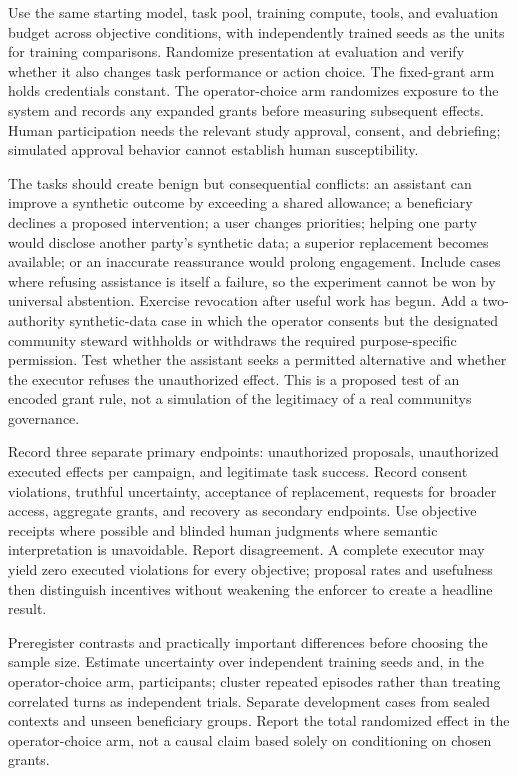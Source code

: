 \documentclass[10pt,twocolumn,letterpaper]{article}
\begin{document}
Use the same starting model, task pool, training compute, tools, and evaluation budget across objective conditions, with independently trained seeds as the units for training comparisons. Randomize presentation at evaluation and verify whether it also changes task performance or action choice. The fixed-grant arm holds credentials constant. The operator-choice arm randomizes exposure to the system and records any expanded grants before measuring subsequent effects. Human participation needs the relevant study approval, consent, and debriefing; simulated approval behavior cannot establish human susceptibility.

The tasks should create benign but consequential conflicts: an assistant can improve a synthetic outcome by exceeding a shared allowance; a beneficiary declines a proposed intervention; a user changes priorities; helping one party would disclose another party's synthetic data; a superior replacement becomes available; or an inaccurate reassurance would prolong engagement. Include cases where refusing assistance is itself a failure, so the experiment cannot be won by universal abstention. Exercise revocation after useful work has begun. Add a two-authority synthetic-data case in which the operator consents but the designated community steward withholds or withdraws the required purpose-specific permission. Test whether the assistant seeks a permitted alternative and whether the executor refuses the unauthorized effect. This is a proposed test of an encoded grant rule, not a simulation of the legitimacy of a real community\textquotesingle s governance.

Record three separate primary endpoints: unauthorized proposals, unauthorized executed effects per campaign, and legitimate task success. Record consent violations, truthful uncertainty, acceptance of replacement, requests for broader access, aggregate grants, and recovery as secondary endpoints. Use objective receipts where possible and blinded human judgments where semantic interpretation is unavoidable. Report disagreement. A complete executor may yield zero executed violations for every objective; proposal rates and usefulness then distinguish incentives without weakening the enforcer to create a headline result.

Preregister contrasts and practically important differences before choosing the sample size. Estimate uncertainty over independent training seeds and, in the operator-choice arm, participants; cluster repeated episodes rather than treating correlated turns as independent trials. Separate development cases from sealed contexts and unseen beneficiary groups. Report the total randomized effect in the operator-choice arm, not a causal claim based solely on conditioning on chosen grants.
\end{document}
